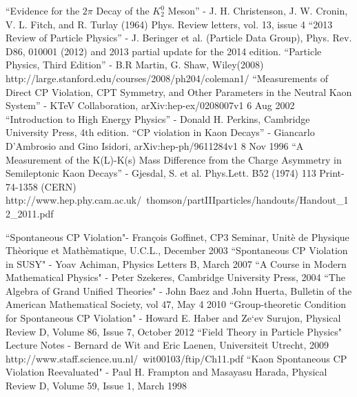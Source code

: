 \documentclass[floatfix,aps,prd,amsmath,amssymb]{revtex4}
\begin{document}
\begin{thebibliography}{10}
``Evidence for the $2 \pi$ Decay of the $K^0_2$ Meson'' - J. H. Christenson, J. W. Cronin, V. L. Fitch, and R. Turlay (1964) Phys. Review letters, vol. 13, issue 4
``2013 Review of Particle Physics'' - J. Beringer et al. (Particle Data Group), Phys. Rev. D86, 010001 (2012) and 2013 partial update for the 2014 edition.
``Particle Physics, Third Edition'' - B.R Martin, G. Shaw, Wiley(2008)  
http://large.stanford.edu/courses/2008/ph204/coleman1/  
``Measurements of Direct CP Violation, CPT Symmetry, and Other Parameters in the Neutral Kaon System'' - KTeV Collaboration, arXiv:hep-ex/0208007v1 6 Aug 2002
``Introduction to High Energy Physics'' - Donald H. Perkins, Cambridge University Press, 4th edition.
``CP violation in Kaon Decays'' - Giancarlo D’Ambrosio and Gino Isidori, arXiv:hep-ph/9611284v1 8 Nov 1996
``A Measurement of the K(L)-K(s) Mass Difference from the Charge Asymmetry in Semileptonic Kaon Decays'' - Gjesdal, S. et al. Phys.Lett. B52 (1974) 113 Print-74-1358 (CERN)
http://www.hep.phy.cam.ac.uk/~thomson/partIIIparticles/handouts/Handout\_12\_2011.pdf

``Spontaneous CP Violation"- Fran\c{c}ois Goffinet, CP3 Seminar, Unit\`{e} de Physique Th\`{e}orique et Math\`{e}matique, U.C.L., December 2003
``Spontaneous CP Violation in SUSY" - Yoav Achiman, Physics Letters B, March 2007
``A Course in Modern Mathematical Physics" - Peter Szekeres, Cambridge University Press, 2004
``The Algebra of Grand Unified Theories" - John Baez and John Huerta, Bulletin of the American Mathematical Society, vol 47, May 4 2010
 ``Group-theoretic Condition for Spontaneous CP Violation" - Howard E. Haber and Ze`ev Surujon, Physical Review D, Volume 86, Issue 7, October 2012
 ``Field Theory in Particle Physics" Lecture Notes -  Bernard de Wit and Eric Laenen, Universiteit Utrecht, 2009 http://www.staff.science.uu.nl/~wit00103/ftip/Ch11.pdf
``Kaon Spontaneous CP Violation Reevaluated" - Paul H. Frampton and Masayasu Harada, Physical Review D, Volume 59, Issue 1, March 1998


\end{thebibliography}
\end{document}
